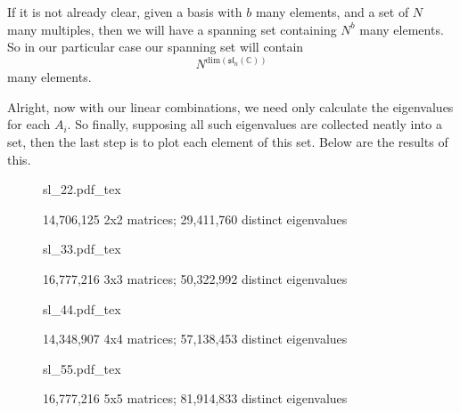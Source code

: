 \documentclass[12pt]{article}
\newcommand{\incfig}[1]{%
    \def\svgwidth{\columnwidth}
    {#1.pdf_tex}
}
\theoremstyle{definition}
\theoremstyle{definition}
\begin{document}
        If it is not already clear, given a basis with $b$ many elements, and a 
        set of $N$ many multiples, then we will have a spanning set containing 
        $N^b$ many elements. So in our particular case our spanning set will contain
        \begin{equation*}
            N^{\text{dim}(\mathfrak{sl}_n(\mathbb{C}))}
        \end{equation*}
        many elements.\par\hspace{4mm} Alright, now with our linear combinations, 
        we need only calculate the eigenvalues for each $A_i$. So finally, supposing 
        all such eigenvalues are collected neatly into a set, then the last step is 
        to plot each element of this set. Below are the results of this.\newpage
        \begin{figure}[htp!]
            \centering
            \incfig{sl_22}
            \caption{14,706,125 2x2 matrices; 29,411,760 distinct eigenvalues}
            \label{fig:14,706,125 2x2 matrices}
        \end{figure}\newpage
        \begin{figure}[htb!]
            \centering
            \incfig{sl_33}
            \caption{16,777,216 3x3 matrices; 50,322,992 distinct eigenvalues}
            \label{fig:2}
        \end{figure}\newpage
        \begin{figure}[htb!]
            \centering
            \incfig{sl_44}
            \caption{14,348,907 4x4 matrices; 57,138,453 distinct eigenvalues}
            \label{fig:}
        \end{figure}\newpage
        \begin{figure}[htb!]
            \centering
            \incfig{sl_55}
            \caption{16,777,216 5x5 matrices; 81,914,833 distinct eigenvalues}
            \label{fig:}
        \end{figure}\newpage
\end{document}
